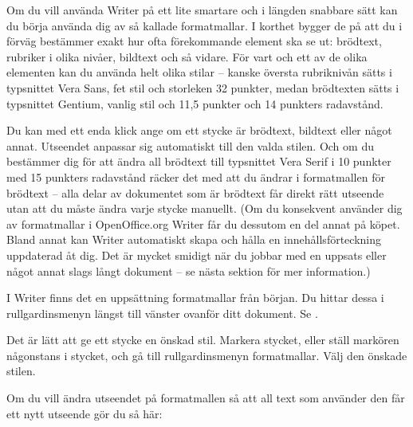 \documentclass[a4paper,final]{memoir} %
\begin{document}
Om du vill använda Writer på ett lite smartare och i längden snabbare sätt kan du börja använda dig av så kallade formatmallar. I korthet bygger de på att du i förväg bestämmer exakt hur ofta förekommande element ska se ut: brödtext, rubriker i olika nivåer, bildtext och så vidare. För vart och ett av de olika elementen kan du använda helt olika stilar -- kanske översta rubriknivån sätts i typsnittet Vera Sans, fet stil och storleken 32 punkter, medan brödtexten sätts i typsnittet Gentium, vanlig stil och 11,5 punkter och 14 punkters radavstånd. 

Du kan med ett enda klick ange om ett stycke är brödtext, bildtext eller något annat. Utseendet anpassar sig automatiskt till den valda stilen. Och om du bestämmer dig för att ändra all brödtext till typsnittet Vera Serif i 10 punkter med 15 punkters radavstånd räcker det med att du ändrar i formatmallen för brödtext -- alla delar av dokumentet som är brödtext får direkt rätt utseende utan att du måste ändra varje stycke manuellt. (Om du konsekvent använder dig av formatmallar i OpenOffice.org Writer får du dessutom en del annat på köpet. Bland annat kan Writer automatiskt skapa och hålla en innehållsförteckning uppdaterad åt dig. Det är mycket smidigt när du jobbar med en uppsats eller något annat slags långt dokument -- se nästa sektion för mer information.)

I Writer finns det en uppsättning formatmallar från början. Du hittar dessa i rullgardinsmenyn längst till vänster ovanför ditt dokument. Se .


Det är lätt att ge ett stycke en önskad stil. Markera stycket, eller ställ markören någonstans i stycket, och gå till rullgardinsmenyn formatmallar. Välj den önskade stilen.

Om du vill ändra utseendet på formatmallen så att all text som använder den får ett nytt utseende gör du så här: 
\end{document}
